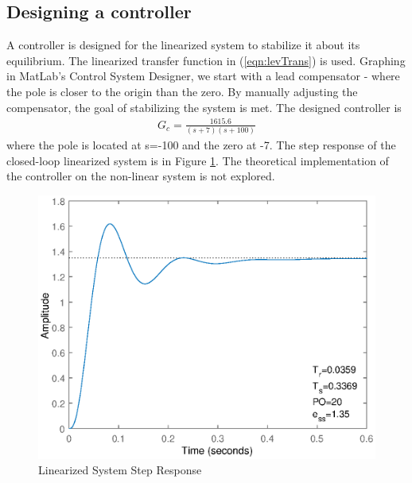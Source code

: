 \documentclass{article}
\begin{document}
    \subsection{Designing a controller}
    A controller is designed for the linearized system to stabilize it about its equilibrium.
    The linearized transfer function in (\ref{eqn:levTrans}) is used.
    Graphing in MatLab's Control System Designer, we start with a lead compensator - where the pole is closer to the origin than the zero.
    By manually adjusting the compensator, the goal of stabilizing the system is met.
    The designed controller is
    \begin{equation}
        \begin{aligned}
            G_c = \frac{1615.6}{(s+7)(s+100)}
        \end{aligned}
    \end{equation}
    where the pole is located at s=-100 and the zero at -7.
    The step response of the closed-loop linearized system is in Figure \ref{fig:LevResponse}. The theoretical implementation of the controller on the non-linear system is not explored.
    \begin{figure}[ht]
        \includegraphics[scale=.5]{LevResponse.eps}
        \caption{Linearized System Step Response}
        \label{fig:LevResponse}
    \end{figure}
\end{document}
